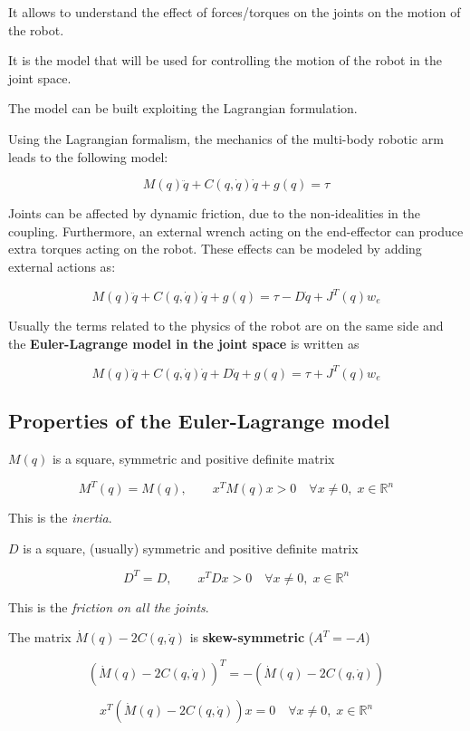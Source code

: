 It allows to understand the effect of forces/torques on the joints on the motion of the robot.
    
It is the model that will be used for controlling the motion of the robot in the joint space.
    
The model can be built exploiting the Lagrangian formulation.

Using the Lagrangian formalism, the mechanics of the multi-body robotic arm leads to the following model:

\[
    M(q)\ddot{q} + C(q, \dot{q})\dot{q} + g(q) = \tau
\]

Joints can be affected by dynamic friction, due to the non-idealities in the coupling. Furthermore, an external wrench acting on the end-effector can produce extra torques acting on the robot. These effects can be modeled by adding external actions as:

\[
    M(q)\ddot{q} + C(q, \dot{q})\dot{q} + g(q) = \tau - D\dot{q} + J^T(q)w_e
\]

Usually the terms related to the physics of the robot are on the same side and the \textbf{Euler-Lagrange model in the joint space} is written as

\[
    M(q)\ddot{q} + C(q, \dot{q})\dot{q} + D\dot{q} + g(q) = \tau + J^T(q)w_e
\]

\hfill

\subsection{Properties of the Euler-Lagrange model}

$M(q)$ is a square, symmetric and positive definite matrix

\[
    M^T(q) = M(q), \qquad x^T M(q) x > 0 \quad \forall x \neq 0, \; x \in \mathbb{R}^n
\]  

This is the \textit{inertia}.

$D$ is a square, (usually) symmetric and positive definite matrix

\[
    D^T = D, \qquad x^T D x > 0 \quad \forall x \neq 0, \; x \in \mathbb{R}^n
\]  

This is the \textit{friction on all the joints}.  

The matrix $\dot{M}(q) - 2C(q,\dot{q})$ is \textbf{skew-symmetric} ($A^T = -A$)  

\[
    (\dot{M}(q) - 2C(q,\dot{q}))^T = -(\dot{M}(q) - 2C(q,\dot{q}))
\]  

\[
    x^T (\dot{M}(q) - 2C(q,\dot{q})) x = 0 \quad \forall x \neq 0, \; x \in \mathbb{R}^n
\]  

